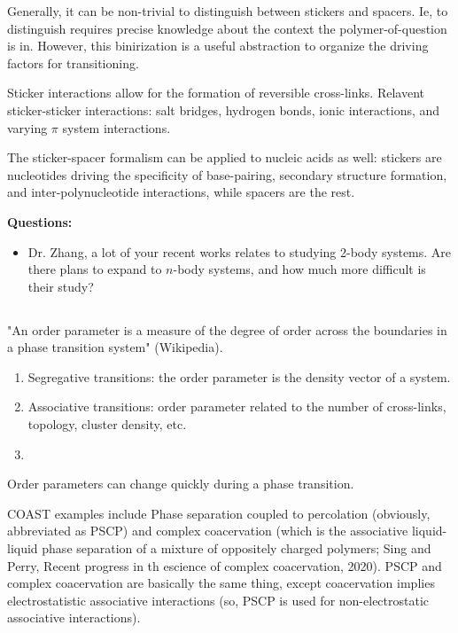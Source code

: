 \documentclass{article}
\begin{document}
Generally, it can be non-trivial to distinguish between stickers and spacers. Ie, to distinguish requires precise knowledge about the context the polymer-of-question is in. However, this binirization is a useful abstraction to organize the driving factors for transitioning.

Sticker interactions allow for the formation of reversible cross-links. Relavent sticker-sticker interactions: salt bridges, hydrogen bonds, ionic interactions, and varying $\pi$ system interactions.

The sticker-spacer formalism can be applied to nucleic acids as well: stickers are nucleotides driving the specificity of base-pairing, secondary structure formation, and inter-polynucleotide interactions, while spacers are the rest.

\textbf{Questions:}

\begin{itemize}
    \item Dr. Zhang, a lot of your recent works relates to studying 2-body systems. Are there plans to expand to $n$-body systems, and how much more difficult is their study?
\end{itemize}

\subsection{}

"An order parameter is a measure of the degree of order across the boundaries in a phase transition system" (Wikipedia).

\begin{enumerate}
    \item Segregative transitions: the order parameter is the density vector of a system.
    \item Associative transitions: order parameter related to the number of cross-links, topology, cluster density, etc.
    \item 
\end{enumerate}

Order parameters can change quickly during a phase transition.

COAST examples include Phase separation coupled to percolation (obviously, abbreviated as PSCP) and complex coacervation (which is the associative liquid-liquid phase separation of a mixture of oppositely charged polymers; Sing and Perry, Recent progress in th escience of complex coacervation, 2020). PSCP and complex coacervation are basically the same thing, except coacervation implies electrostatistic associative interactions (so, PSCP is used for non-electrostatic associative interactions).
\end{document}
